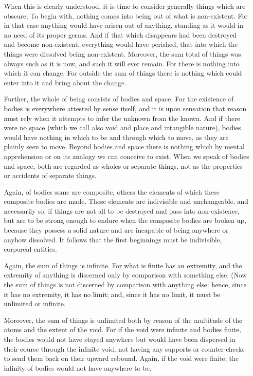 \documentclass{stex}
\begin{document}
When this is clearly understood, it is time to consider generally things which are obscure.
To begin with, nothing comes into being out of what is non-existent.
For in that case anything would have arisen out of anything, standing as it would in no need of its proper germs.
And if that which disappears had been destroyed and become non-existent, everything would have perished, that into which the things were dissolved being non-existent.
Moreover, the sum total of things was always such as it is now, and such it will ever remain.
For there is nothing into which it can change.
For outside the sum of things there is nothing which could enter into it and bring about the change.

Further, the whole of being consists of bodies and space.
For the existence of bodies is everywhere attested by sense itself, and it is upon sensation that reason must rely when it attempts to infer the unknown from the known.
And if there were no space (which we call also void and place and intangible nature), bodies would have nothing in which to be and through which to move, as they are plainly seen to move.
Beyond bodies and space there is nothing which by mental apprehension or on its analogy we can conceive to exist.
When we speak of bodies and space, both are regarded as wholes or separate things, not as the properties or accidents of separate things.

Again, of bodies some are composite, others the elements of which these composite bodies are made.
These elements are indivisible and unchangeable, and necessarily so, if things are not all to be destroyed and pass into non-existence, but are to be strong enough to endure when the composite bodies are broken up, because they possess a solid nature and are incapable of being anywhere or anyhow dissolved.
It follows that the first beginnings must be indivisible, corporeal entities.

Again, the sum of things is infinite.
For what is finite has an extremity, and the extremity of anything is discerned only by comparison with something else.
(Now the sum of things is not discerned by comparison with anything else: hence, since it has no extremity, it has no limit; and, since it has no limit, it must be unlimited or infinite.

Moreover, the sum of things is unlimited both by reason of the multitude of the atoms and the extent of the void.
For if the void were infinite and bodies finite, the bodies would not have stayed anywhere but would have been dispersed in their course through the infinite void, not having any supports or counter-checks to send them back on their upward rebound.
Again, if the void were finite, the infinity of bodies would not have anywhere to be.
\end{document}
